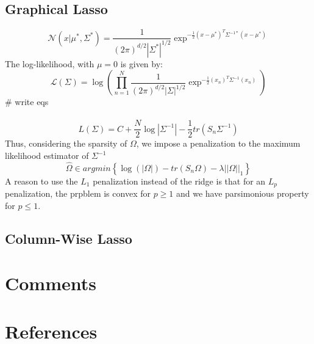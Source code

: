 \documentclass[12pt]{article}
\def\hat{\widehat}
\begin{document}
\subsection{Graphical Lasso}
$$
\mathcal N(x|\mu^*,\Sigma^*)
=\frac{1}{(2\pi)^{d/2}|\Sigma^*|^{1/2}}\exp^{-\frac{1}{2}(x-\mu^*)^T\Sigma^{-1*}(x-\mu^*)}
$$
The log-likelihood, with $\mu=0$ is given by:
$$
\mathcal{L}(\Sigma)=\log\left(\prod_{n=1}^N\frac{1}{(2\pi)^{d/2}|\Sigma|^{1/2}}\exp^{-\frac{1}{2}(x_n)^T\Sigma^{-1}(x_n)}\right)
$$
\# write eqs\\
\\
$$
L(\Sigma)=C
+\frac{N}{2}\log|\Sigma^{-1}|-\frac{1}{2} tr(S_n\Sigma^{-1})
$$
Thus, considering the sparsity of $\Omega$, we impose a penalization to the maximum likelihood estimator of $\Sigma^{-1}$
$$
\hat\Omega\in argmin\left\{ \log(|\Omega|)-tr(S_n\Omega)-\lambda||\Omega||_1   \right\}
$$
A reason to use the $L_1$ penalization instead of the ridge is that for an $L_p$ penalization, the prpblem is convex for $p\geq 1$ and we have parsimonious property for $p\leq 1$.
\subsection{Column-Wise Lasso}
\section{Comments}
\section{References}
\end{document}
